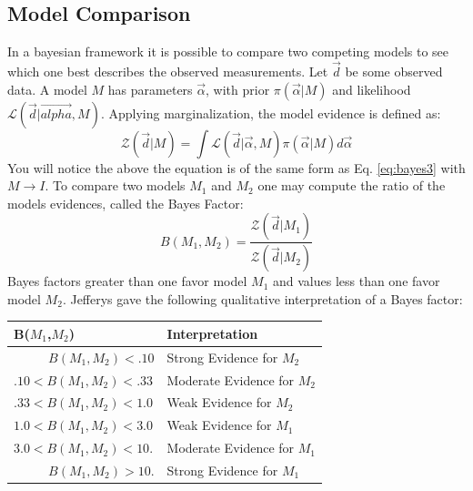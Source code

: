 \documentclass[12pt]{article}
\numberwithin{equation}{section}
\begin{document}
\subsection{Model Comparison}
In a bayesian framework it is possible to compare two competing models to see which one best describes the observed measurements.
Let $\vec{d}$ be some observed data. A model $M$ has parameters $\vec{\alpha}$, with prior $\pi(\vec{\alpha}|M)$ and likelihood $\mathcal{L}(\vec{d}|\vec{alpha},M)$. Applying marginalization, the model evidence is defined as:
\begin{equation} \label{eq:evidence}
	\mathcal{Z}(\vec{d}|M) = \int \mathcal{L}(\vec{d}|\vec{\alpha},M)\pi(\vec{\alpha}|M)d\vec{\alpha}
\end{equation}
You will notice the above the equation is of the same form as Eq. \ref{eq:bayes3} with $M \rightarrow I$. To compare two models $M_1$ and $M_2$ one may compute the ratio of the models evidences, called the Bayes Factor\cite{von2011bayesian}:
\begin{equation} \label{eq:bayesfactor}
	B(M_1,M_2) = \frac{\mathcal{Z}(\vec{d}|M_1)}{\mathcal{Z}(\vec{d}|M_2)} 
\end{equation}
Bayes factors greater than one favor model $M_1$ and values less than one favor model $M_2$. Jefferys\cite
{jeffreys1998theory} gave the following qualitative interpretation of a Bayes factor:
\begin{center}
	\begin{tabular}{l|l}
		\bf{B($M_1$,$M_2$)} & \bf{Interpretation} \\ 
		\hline
		${\qquad \;\;\, B(M_1,M_2) < .10}$ & Strong Evidence for $M_2$ \\
		${.10 < B(M_1,M_2) < .33}$ & Moderate Evidence for $M_2$ \\
		${.33 < B(M_1,M_2) < 1.0}$ & Weak Evidence for $M_2$ \\
		${1.0 < B(M_1,M_2) < 3.0}$ & Weak Evidence for $M_1$ \\
		${3.0 < B(M_1,M_2) < 10.}$ & Moderate Evidence for $M_1$ \\
		${\qquad \;\;\, B(M_1,M_2) > 10.}$ & Strong Evidence for $M_1$ \\
	\end{tabular}
	\label{tab:bayesfactor}
\end{center}
\end{document}
